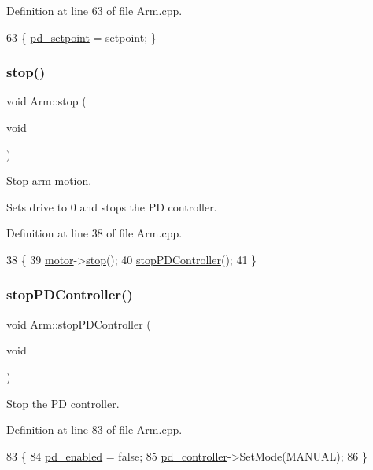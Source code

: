 Definition at line 63 of file Arm.\+cpp.


\begin{DoxyCode}
63 \{ \hyperlink{class_arm_a1f4bd75360f1fa61330494569b08f4aa}{pd\_setpoint} = setpoint; \}
\end{DoxyCode}
\mbox{\label{class_arm_a4a2070a27aecb7129cb89f4c9231278a}} 
\subsubsection{\texorpdfstring{stop()}{stop()}}
{\footnotesize\ttfamily void Arm\+::stop (\begin{DoxyParamCaption}\item[{void}]{ }\end{DoxyParamCaption})}



Stop arm motion. 

Sets drive to 0 and stops the PD controller. 

Definition at line 38 of file Arm.\+cpp.


\begin{DoxyCode}
38                    \{
39     \hyperlink{class_arm_aa2ef91b2548b256c65dc92166867ba49}{motor}->\hyperlink{class_v_e_x_motor_aed9dadedda6a075093f076921958e7ed}{stop}();
40     \hyperlink{class_arm_a387289c28547f8e7eccdb085afddb43a}{stopPDController}();
41 \}
\end{DoxyCode}
\mbox{\label{class_arm_a387289c28547f8e7eccdb085afddb43a}} 
\subsubsection{\texorpdfstring{stop\+P\+D\+Controller()}{stopPDController()}}
{\footnotesize\ttfamily void Arm\+::stop\+P\+D\+Controller (\begin{DoxyParamCaption}\item[{void}]{ }\end{DoxyParamCaption})}



Stop the PD controller. 



Definition at line 83 of file Arm.\+cpp.


\begin{DoxyCode}
83                                \{
84     \hyperlink{class_arm_a44b074fd8db815261bc634f914c1e0f8}{pd\_enabled} = \textcolor{keyword}{false};
85     \hyperlink{class_arm_a6a6a8ec7d6f383efd1672c1760a32887}{pd\_controller}->SetMode(MANUAL);
86 \}
\end{DoxyCode}



